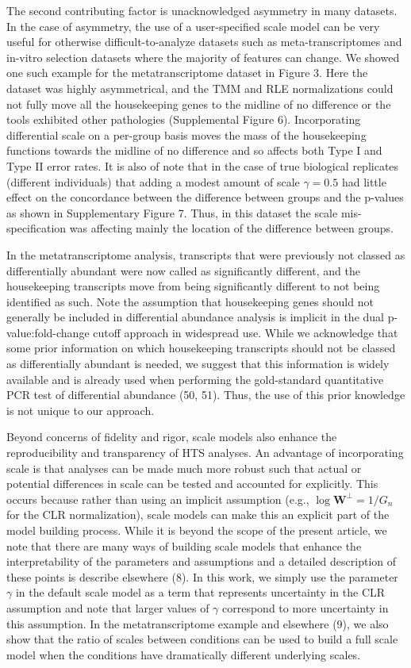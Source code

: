 \documentclass[
]{article}
\begin{document}
The second contributing factor is unacknowledged asymmetry in many
datasets. In the case of asymmetry, the use of a user-specified scale
model can be very useful for otherwise difficult-to-analyze datasets
such as meta-transcriptomes and in-vitro selection datasets where the
majority of features can change. We showed one such example for the
metatranscriptome dataset in Figure 3. Here the dataset was highly
asymmetrical, and the TMM and RLE normalizations could not fully move
all the housekeeping genes to the midline of no difference or the tools
exhibited other pathologies (Supplemental Figure 6). Incorporating
differential scale on a per-group basis moves the mass of the
housekeeping functions towards the midline of no difference and so
affects both Type I and Type II error rates. It is also of note that in
the case of true biological replicates (different individuals) that
adding a modest amount of scale \(\gamma=0.5\) had little effect on the
concordance between the difference between groups and the p-values as
shown in Supplementary Figure 7. Thus, in this dataset the scale
mis-specification was affecting mainly the location of the difference
between groups.

In the metatranscriptome analysis, transcripts that were previously not
classed as differentially abundant were now called as significantly
different, and the housekeeping transcripts move from being
significantly different to not being identified as such. Note the
assumption that housekeeping genes should not generally be included in
differential abundance analysis is implicit in the dual
p-value:fold-change cutoff approach in widespread use. While we
acknowledge that some prior information on which housekeeping
transcripts should not be classed as differentially abundant is needed,
we suggest that this information is widely available and is already used
when performing the gold-standard quantitative PCR test of differential
abundance (50, 51). Thus, the use of this prior knowledge is not unique
to our approach.

Beyond concerns of fidelity and rigor, scale models also enhance the
reproducibility and transparency of HTS analyses. An advantage of
incorporating scale is that analyses can be made much more robust such
that actual or potential differences in scale can be tested and
accounted for explicitly. This occurs because rather than using an
implicit assumption (e.g., \(\log \mathbf{W}^{\perp}=1/G_{n}\) for the
CLR normalization), scale models can make this an explicit part of the
model building process. While it is beyond the scope of the present
article, we note that there are many ways of building scale models that
enhance the interpretability of the parameters and assumptions and a
detailed description of these points is describe elsewhere (8). In this
work, we simply use the parameter \(\gamma\) in the default scale model
as a term that represents uncertainty in the CLR assumption and note
that larger values of \(\gamma\) correspond to more uncertainty in this
assumption. In the metatranscriptome example and elsewhere (9), we also
show that the ratio of scales between conditions can be used to build a
full scale model when the conditions have dramatically different
underlying scales.
\end{document}
